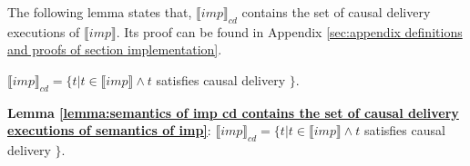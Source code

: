 The following lemma states that, $\llbracket imp \rrbracket_{cd}$ contains the set of causal delivery executions of $\llbracket imp \rrbracket$. Its proof can be found in Appendix \ref{sec:appendix definitions and proofs of section implementation}.

\begin{lemma}
\label{lemma:semantics of imp cd contains the set of causal delivery executions of semantics of imp}

$\llbracket imp \rrbracket_{cd} = \{ t \vert t \in \llbracket imp \rrbracket \wedge t$ satisfies causal delivery $\}$.
\end{lemma}


{\noindent \bf Lemma \ref{lemma:semantics of imp cd contains the set of causal delivery executions of semantics of imp}}: $\llbracket imp \rrbracket_{cd} = \{ t \vert t \in \llbracket imp \rrbracket \wedge t$ satisfies causal delivery $\}$.

